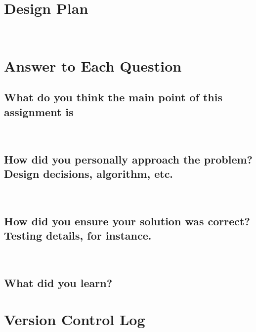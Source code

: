 \documentclass[onecolumn, draftclsnofoot,10pt, compsoc]{IEEEtran}
\begin{document}
\section{Design Plan}
\noindent
\\

\section{Answer to Each Question }
\subsection{What do you think the main point of this assignment is}

\noindent 
\\

\subsection{How did you personally approach the problem? Design decisions, algorithm, etc.}

\noindent 
\\

\subsection{How did you ensure your solution was correct? Testing details, for instance.}
\noindent 
\\

\subsection{What did you learn?}
\noindent 

\section{Version Control Log}
\end{document}

